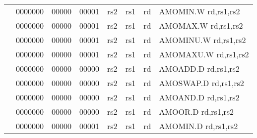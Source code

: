 \begin{table}[p]
\begin{small}
\begin{center}
\begin{tabular}{rcccccccccl}
&
\multicolumn{1}{|c|}{0000000} &
\multicolumn{3}{c|}{00000} &
\multicolumn{2}{c|}{00001} &
\multicolumn{1}{c|}{rs2} &
\multicolumn{1}{c|}{rs1} &
\multicolumn{1}{c|}{rd} & AMOMIN.W rd,rs1,rs2 \\
\cline{2-10}
  

&
\multicolumn{1}{|c|}{0000000} &
\multicolumn{3}{c|}{00000} &
\multicolumn{2}{c|}{00001} &
\multicolumn{1}{c|}{rs2} &
\multicolumn{1}{c|}{rs1} &
\multicolumn{1}{c|}{rd} & AMOMAX.W rd,rs1,rs2 \\
\cline{2-10}
  

&
\multicolumn{1}{|c|}{0000000} &
\multicolumn{3}{c|}{00000} &
\multicolumn{2}{c|}{00001} &
\multicolumn{1}{c|}{rs2} &
\multicolumn{1}{c|}{rs1} &
\multicolumn{1}{c|}{rd} & AMOMINU.W rd,rs1,rs2 \\
\cline{2-10}
  

&
\multicolumn{1}{|c|}{0000000} &
\multicolumn{3}{c|}{00000} &
\multicolumn{2}{c|}{00001} &
\multicolumn{1}{c|}{rs2} &
\multicolumn{1}{c|}{rs1} &
\multicolumn{1}{c|}{rd} & AMOMAXU.W rd,rs1,rs2 \\
\cline{2-10}
  

&
\multicolumn{1}{|c|}{0000000} &
\multicolumn{3}{c|}{00000} &
\multicolumn{2}{c|}{00000} &
\multicolumn{1}{c|}{rs2} &
\multicolumn{1}{c|}{rs1} &
\multicolumn{1}{c|}{rd} & AMOADD.D rd,rs1,rs2 \\
\cline{2-10}
  

&
\multicolumn{1}{|c|}{0000000} &
\multicolumn{3}{c|}{00000} &
\multicolumn{2}{c|}{00000} &
\multicolumn{1}{c|}{rs2} &
\multicolumn{1}{c|}{rs1} &
\multicolumn{1}{c|}{rd} & AMOSWAP.D rd,rs1,rs2 \\
\cline{2-10}
  

&
\multicolumn{1}{|c|}{0000000} &
\multicolumn{3}{c|}{00000} &
\multicolumn{2}{c|}{00000} &
\multicolumn{1}{c|}{rs2} &
\multicolumn{1}{c|}{rs1} &
\multicolumn{1}{c|}{rd} & AMOAND.D rd,rs1,rs2 \\
\cline{2-10}
  

&
\multicolumn{1}{|c|}{0000000} &
\multicolumn{3}{c|}{00000} &
\multicolumn{2}{c|}{00000} &
\multicolumn{1}{c|}{rs2} &
\multicolumn{1}{c|}{rs1} &
\multicolumn{1}{c|}{rd} & AMOOR.D rd,rs1,rs2 \\
\cline{2-10}
  

&
\multicolumn{1}{|c|}{0000000} &
\multicolumn{3}{c|}{00000} &
\multicolumn{2}{c|}{00001} &
\multicolumn{1}{c|}{rs2} &
\multicolumn{1}{c|}{rs1} &
\multicolumn{1}{c|}{rd} & AMOMIN.D rd,rs1,rs2 \\
\cline{2-10}
  


\end{tabular}
\end{center}
\end{small}
\end{table}

